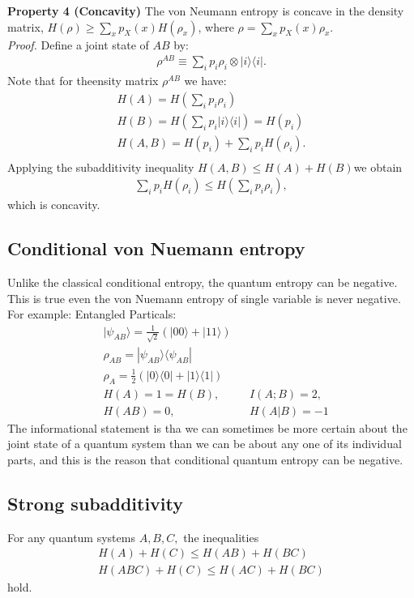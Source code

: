 \textbf{Property 4 (Concavity)}
The von Neumann entropy is concave in the density matrix, $H(\rho) \geq \sum_x p_X(x) H(\rho_x)$, where $\rho = \sum_x p_X(x)\rho_x$. \\
\textit{Proof.} Define a joint state of $AB$ by:
\begin{align*}
\rho^{AB} \equiv \sum_i p_i \rho_i \otimes |i\rangle \langle i|.
\end{align*}
Note that for theensity matrix $\rho^{AB}$ we have:
\begin{align*}
H(A)=H(\sum_i p_i \rho_i) \\
H(B)=H(\sum_i p_i |i \rangle \langle i|)=H(p_i) \\
H(A,B)=H(p_i)+\sum_i p_i H(\rho_i). \\
\end{align*}
Applying the subadditivity inequality $H(A,B) \leq H(A)+H(B)$we obtain
\begin{align*}
\sum_i p_i H(\rho_i) \leq H(\sum_i p_i \rho_i),
\end{align*}
which is concavity.

\subsection{Conditional von Nuemann entropy}
Unlike the classical conditional entropy, the quantum entropy can be negative. This is true even the von Nuemann entropy of single variable is never negative. \\
For example:
Entangled Particals:
\begin{align*}
& |\psi_{AB} \rangle = \frac{1}{\sqrt{2}}(|00\rangle + |11\rangle) \\
& \rho_{AB}= |\psi_{AB} \rangle \langle \psi_{AB}| \\
& \rho_A=\frac{1}{2}(|0\rangle \langle 0| + |1\rangle \langle 1|) \\
& H(A)=1=H(B), & &I(A;B)=2,  \\
& H(AB)=0, & &H(A|B)=-1 
\end{align*}
The informational statement is tha we can sometimes be more certain about the joint state of a quantum system than we can be about any one of its individual parts, and this is the reason that conditional  quantum entropy can be negative.

\subsection{Strong subadditivity}
For any quantum systems $A, B, C,$ the inequalities
\begin{align*}
H(A)+H(C) \leq H(AB)+H(BC) \\
H(ABC)+H(C) \leq H(AC)+H(BC)
\end{align*}
hold.

